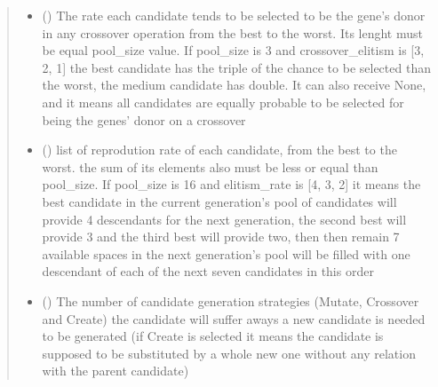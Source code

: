 \documentclass[letterpaper,10pt,english]{sphinxmanual}
\begin{document}
\begin{fulllineitems}
\begin{quote}
\begin{description}
\begin{itemize}
\item {} 
\sphinxAtStartPar
{} (\sphinxstyleliteralemphasis{\sphinxupquote{{[}}}\sphinxstyleliteralemphasis{\sphinxupquote{{[}}}\sphinxstyleliteralemphasis{\sphinxupquote{{]}}}\sphinxstyleliteralemphasis{\sphinxupquote{, }}\sphinxstyleliteralemphasis{\sphinxupquote{{]}}}) \textendash{} The rate each candidate tends to be selected to be the gene’s donor in any crossover
operation from the best to the worst. Its lenght must be equal pool\_size value. If pool\_size is 3 and
crossover\_elitism is {[}3, 2, 1{]} the best candidate has the triple of the chance to be selected than the
worst, the medium candidate has double. It can also receive None, and it means all candidates are equally
probable to be selected for being the genes’ donor on a crossover

\item {} 
\sphinxAtStartPar
{} (\sphinxstyleliteralemphasis{\sphinxupquote{{[}}}\sphinxstyleliteralemphasis{\sphinxupquote{{[}}}\sphinxstyleliteralemphasis{\sphinxupquote{{]}}}\sphinxstyleliteralemphasis{\sphinxupquote{, }}\sphinxstyleliteralemphasis{\sphinxupquote{{]}}}) \textendash{} list of reprodution rate of each candidate, from the best to the worst. the sum of its
elements also must be less or equal than pool\_size. If pool\_size is 16 and elitism\_rate is {[}4, 3, 2{]} it
means the best candidate in the current generation’s pool of candidates will provide 4 descendants for the
next generation, the second best will provide 3 and the third best will provide two, then then remain 7
available spaces in the next generation’s pool will be filled with one descendant of each of the next seven
candidates in this order

\item {} 
\sphinxAtStartPar
{} () \textendash{} The number of candidate generation strategies (Mutate, Crossover and Create) the candidate
will suffer aways a new candidate is needed to be generated (if Create is selected it means the candidate is
supposed to be substituted by a whole new one without any relation with the parent candidate)


\end{itemize}
\end{description}
\end{quote}
\end{fulllineitems}
\end{document}
